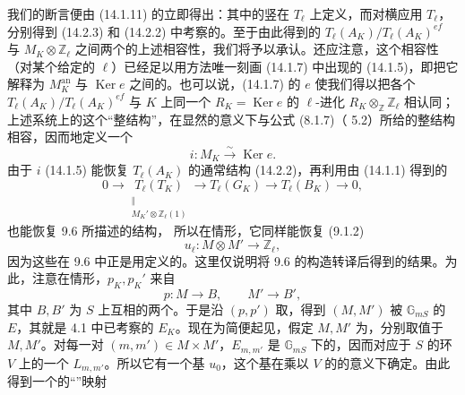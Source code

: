 我们的断言便由 (14.1.11) 的立即得出：其中的竖在 $T_\ell$ 上定义，而对横应用 $T_\ell$，分别得到 (14.2.3) 和 (14.2.2) 中考察的。至于由此得到的 $T_\ell(A_K)/T_\ell(A_K)^{ef}$ 与 $M_K\otimes\mathbb Z_\ell$ 之间两个的上述相容性，我们将予以承认。还应注意，这个相容性（对某个给定的 $\ell$）已经足以用方法唯一刻画 (14.1.7) 中出现的 (14.1.5)，即把它解释为 $M_K^{\mathrm{an}}$ 与 $\operatorname{Ker}e$ 之间的。也可以说，(14.1.7) 的 $e$ 使我们得以把各个 $T_\ell(A_K)/T_\ell(A_K)^{ef}$ 与 $K$ 上同一个 $R_K=\operatorname{Ker}e$ 的 $\ell$-进化 $R_K\otimes_{\mathbb Z}\mathbb Z_\ell$ 相认同；上述系统上的这个“整结构”，在显然的意义下与公式 (8.1.7)（ 5.2）所给的整结构相容，因而地定义一个
\[
i:M_K\xrightarrow\sim\operatorname{Ker}e.
\]
由于 $i$ (14.1.5) 能恢复 $T_\ell(A_K)$ 的通常结构 (14.2.2)，再利用由 (14.1.1) 得到的
\[
0\longrightarrow\underset{\substack{\Vert\\M_K'\otimes\mathbb Z_\ell(1)}}{T_\ell(T_K)}
\longrightarrow T_\ell(G_K)\longrightarrow T_\ell(B_K)\longrightarrow0,
\]
也能恢复 9.6 所描述的结构，
所以在情形，它同样能恢复 (9.1.2)
\begin{equation}\tag{14.2.4}
u_\ell:M\otimes M'\longrightarrow\mathbb Z_\ell,
\end{equation}
因为这些在 9.6 中正是用定义的。这里仅说明将 9.6 的构造转译后得到的结果。为此，注意在情形，$p_K,p_K'$ 来自
\[
p:M\longrightarrow B,\qquad M'\longrightarrow B',
\]
其中 $B,B'$ 为 $S$ 上互相的两个。于是沿 $(p,p')$ 取，得到 $(M,M')$ 被 $\mathbb G_{mS}$ 的 $E$，其就是 4.1 中已考察的 $E_K$。现在为简便起见，假定 $M,M'$ 为，分别取值于 $M,M'$。对每一对 $(m,m')\in M\times M'$，$E_{m,m'}$ 是 $\mathbb G_{mS}$ 下的，因而对应于 $S$ 的环 $V$ 上的一个 $L_{m,m'}$。所以它有一个基 $u_0$，这个基在乘以 $V$ 的的意义下确定。由此得到一个的“”映射
